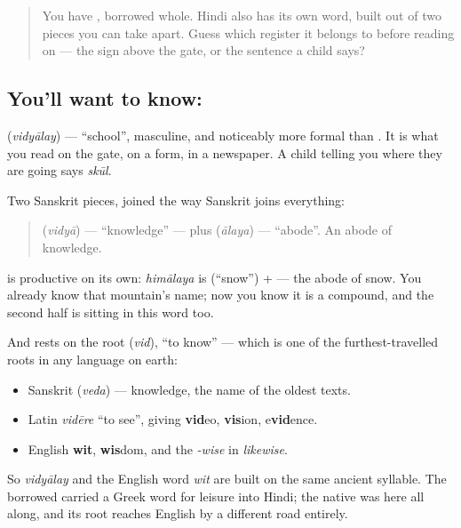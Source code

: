 \label{lesson:HI-C81-vidyalaya}



\begin{quote}
You have \textbf{}, borrowed whole. Hindi also has its own word, built out of two pieces you can take apart. Guess which register it belongs to before reading on — the sign above the gate, or the sentence a child says?
\end{quote}

\subsection*{You'll want to know: }
\textbf{} (\emph{vidyālay}) — \textquotedblleft{}school\textquotedblright{}, masculine, and noticeably more formal than \textbf{}. It is what you read on the gate, on a form, in a newspaper. A child telling you where they are going says \emph{skūl}.

\begin{cousinweb}
Two Sanskrit pieces, joined the way Sanskrit joins everything:

\begin{quote}
\textbf{} (\emph{vidyā}) — \textquotedblleft{}knowledge\textquotedblright{} — plus \textbf{} (\emph{ālaya}) — \textquotedblleft{}abode\textquotedblright{}. An abode of knowledge.
\end{quote}

\textbf{} is productive on its own: \emph{himālaya} is \textbf{} (\textquotedblleft{}snow\textquotedblright{}) +  — the abode of snow. You already know that mountain's name; now you know it is a compound, and the second half is sitting in this word too.

And \textbf{} rests on the root \textbf{} (\emph{vid}), \textquotedblleft{}to know\textquotedblright{} — which is one of the furthest-travelled roots in any language on earth:

\begin{itemize}
\raggedright
  \item Sanskrit \textbf{} (\emph{veda}) — knowledge, the name of the oldest texts.
  \item Latin \emph{vidēre} \textquotedblleft{}to see\textquotedblright{}, giving \textbf{vid}eo, \textbf{vis}ion, e\textbf{vid}ence.
  \item English \textbf{wit}, \textbf{wis}dom, and the \emph{-wise} in \emph{likewise}.
\end{itemize}

So \emph{vidyālay} and the English word \emph{wit} are built on the same ancient syllable. The borrowed \textbf{} carried a Greek word for leisure into Hindi; the native \textbf{} was here all along, and its root reaches English by a different road entirely.
\end{cousinweb}

